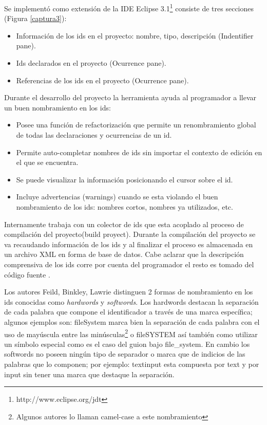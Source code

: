 \documentclass[12pt]{report}
\begin{document}
Se implementó como extensión de la IDE Eclipse 3.1\footnote[2]{http://www.eclipse.org/jdt} consiste de tres secciones (Figura \ref{captura3}):

\begin{itemize}
\itemsep0em%
\item Información de los ids en el proyecto: nombre, tipo, descripción (Indentifier pane).
\item Ids declarados en el proyecto (Ocurrence pane).
\item Referencias de los ids en el proyecto (Ocurrence pane).
\end{itemize}

Durante el desarrollo del proyecto la herramienta ayuda al programador a llevar un buen nombramiento en los ids: 

\begin{itemize}
\itemsep0em%
\item Posee una función de refactorización que permite un renombramiento global de todas las declaraciones y ocurrencias de un id.
\item Permite auto-completar nombres de ids sin importar el contexto de edición en el que se encuentra.
\item Se puede visualizar la información posicionando el cursor sobre el id.
\item Incluye advertencias (warnings) cuando se esta violando el buen nombramiento de los ids: nombres cortos, nombres ya utilizados, etc.
\end{itemize}

Internamente trabaja con un colector de ids que esta acoplado al proceso de compilación del proyecto(build proyect). Durante la compilación del proyecto se va recaudando información de los ids y al finalizar el proceso es almacenada en un archivo XML en forma de base de datos. Cabe aclarar que la descripción comprensiva de los ids corre por cuenta del programador el resto es tomado del código fuente \cite{DFPM05}.
 


Los autores Feild, Binkley, Lawrie \cite{FBL06,HDD06} distinguen 2 formas de nombramiento en los ids conocidas como \textit{hardwords} y \textit{softwords}. Los hardwords destacan la separación de cada palabra que compone el identificador a través de una marca específica; algunos ejemplos son: \textsf{fileSystem} marca bien la separación de cada palabra con el uso de mayúscula entre las minúsculas\footnote[1]{Algunos autores lo llaman camel-case a este nombramiento} o \textsf{fileSYSTEM} así también como utilizar un símbolo especial como es el caso del guion bajo \textsf{file\_system}. En cambio los softwords no poseen ningún tipo de separador o marca que de indicios de las palabras que lo componen; por ejemplo: \textsf{textinput} esta compuesta por \textsf{text} y por \textsf{input} sin tener una marca que destaque la separación.
\end{document}
